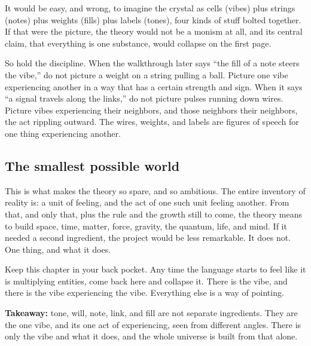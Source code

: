 It would be easy, and wrong, to imagine the crystal as cells (vibes) plus strings (notes) plus weights (fills) plus labels (tones), four kinds of stuff bolted together. If that were the picture, the theory would not be a monism at all, and its central claim, that everything is one substance, would collapse on the first page.

So hold the discipline. When the walkthrough later says ``the fill of a note steers the vibe,'' do not picture a weight on a string pulling a ball. Picture one vibe experiencing another in a way that has a certain strength and sign. When it says ``a signal travels along the links,'' do not picture pulses running down wires. Picture vibes experiencing their neighbors, and those neighbors their neighbors, the act rippling outward. The wires, weights, and labels are figures of speech for one thing experiencing another.

\subsection{The smallest possible world}

This is what makes the theory so spare, and so ambitious. The entire inventory of reality is: a unit of feeling, and the act of one such unit feeling another. From that, and only that, plus the rule and the growth still to come, the theory means to build space, time, matter, force, gravity, the quantum, life, and mind. If it needed a second ingredient, the project would be less remarkable. It does not. One thing, and what it does.

Keep this chapter in your back pocket. Any time the language starts to feel like it is multiplying entities, come back here and collapse it. There is the vibe, and there is the vibe experiencing the vibe. Everything else is a way of pointing.

\textbf{Takeaway:} tone, will, note, link, and fill are not separate ingredients. They are the one vibe, and its one act of experiencing, seen from different angles. There is only the vibe and what it does, and the whole universe is built from that alone.
